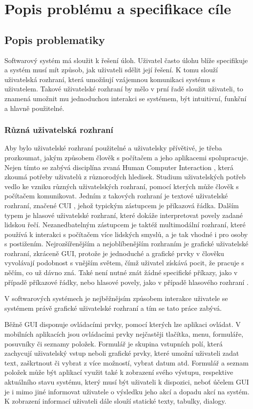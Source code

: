 \chapter{Popis problému a specifikace cíle}
\section{Popis problematiky}

Softwarový systém má sloužit k řešení úloh. Uživatel často úlohu blíže specifikuje a systém musí mít způsob, jak uživateli sdělit její řešení. K tomu slouží uživatelská rozhraní, která umožňují vzájemnou komunikaci systému s uživatelem. Takové uživatelské rozhraní by mělo v prní řadě sloužit uživateli, to znamená umožnit mu jednoduchou interakci se systémem, být intuitivní, funkční a hlavně použitelné. 

\subsection{Různá uživatelská rozhraní}
Aby bylo uživatelské rozhraní použitelné a uživatelsky přívětivé, je třeba prozkoumat, jakým způsobem člověk s počítačem a jeho aplikacemi spolupracuje. Nejen tímto se zabývá disciplína zvaná Human Computer Interaction \cite{uiTypes}, která zkoumá potřeby uživatelů z různorodých hledisek. Studium uživatelských potřeb vedlo ke vzniku různých uživatelských rozhraní, pomocí kterých může člověk s počítačem komunikovat. Jedním z takových rozhraní je textové uživatelské rozhraní, značené CUI \cite{uiTypes}, jehož typickým zástupcem je příkazová řádka. Dalším typem je hlasové uživatelské rozhraní, které dokáže interpretovat povely zadané lidskou řečí. Nezanedbatelným zástupcem je taktéž multimodální rozhraní, které používá k interakci s počítačem více lidských smyslů, a je tak vhodné i pro osoby s postižením. Nejrozšířenějším a nejoblíbenějším rozhraním je grafické uživatelské rozhraní, zkráceně GUI, protože je jednoduché a grafické prvky v člověku vyvolávají podobnost s vnějším světem, čímž uživatel získává pocit, že pracuje s něčím, co už dávno zná. Také není nutné znát žádné specifické příkazy, jako v případě příkazové řádky, nebo hlasové povely, jako v případě hlasového rozhraní \cite{uiTypes}. 

V softwarových systémech je nejběžnějsím způsobem interakce uživatele se systémem právě grafické uživatelské rozhraní a tím se tato práce zabývá. 

Běžně GUI disponuje ovládacími prvky, pomocí kterých lze aplikaci ovládat. V mobilních aplikacích jsou ovládacími prvky nejčastěji tlačítka, menu, formuláře, posuvníky či seznamy položek. Formulář je skupina vstupních polí, která zachycují uživatelský vstup neboli grafické prvky, které umožní uživateli zadat text, zaškrtnout či vybrat z více možností, vybrat datum atd. Formulář a seznam položek může být aplikací využit také k zobrazení svého výstupu, respektive aktuálního stavu systému, který musí být uživateli k dispozici, neboť účelem GUI je i mimo jiné informovat uživatele o výsledku jeho akcí a dopadu akcí na systém. K zobrazení informací uživateli dále slouží statické texty, tabulky, dialogy. 

